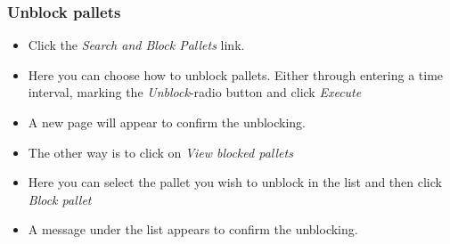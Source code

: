 \documentclass[a4paper]{article}
\begin{document}
\subsubsection{Unblock pallets}
\begin{itemize}
	\item Click the \emph{Search and Block Pallets} link.
	\item Here you can choose how to unblock pallets. Either through entering a time interval, marking the \emph{Unblock}-radio button and click \emph{Execute}
	\item A new page will appear to confirm the unblocking.
	\item The other way is to click on \emph{View blocked pallets}
	\item Here you can select the pallet you wish to unblock in the list and then click \emph{Block pallet}
	\item A message under the list appears to confirm the unblocking.
\end{itemize}
\end{document}
